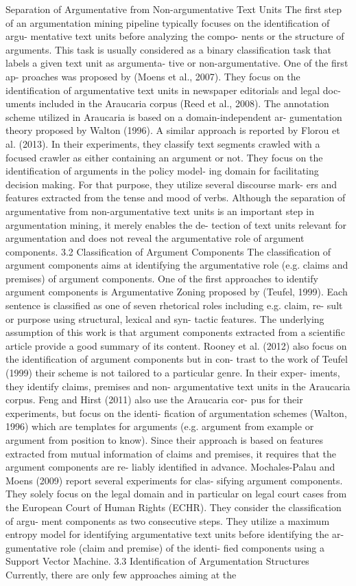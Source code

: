 Separation of Argumentative from Non-argumentative Text Units The first step of an argumentation mining pipeline typically focuses on the identification of argu- mentative text units before analyzing the compo- nents or the structure of arguments. This task is usually considered as a binary classification task that labels a given text unit as argumenta- tive or non-argumentative. One of the first ap- proaches was proposed by (Moens et al., 2007). They focus on the identification of argumentative text units in newspaper editorials and legal doc- uments included in the Araucaria corpus (Reed et al., 2008). The annotation scheme utilized in Araucaria is based on a domain-independent ar- gumentation theory proposed by Walton (1996). A similar approach is reported by Florou et al. (2013). In their experiments, they classify text segments crawled with a focused crawler as either containing an argument or not. They focus on the identification of arguments in the policy model- ing domain for facilitating decision making. For that purpose, they utilize several discourse mark- ers and features extracted from the tense and mood of verbs. Although the separation of argumentative from non-argumentative text units is an important step in argumentation mining, it merely enables the de- tection of text units relevant for argumentation and does not reveal the argumentative role of argument components. 3.2 Classification of Argument Components The classification of argument components aims at identifying the argumentative role (e.g. claims and premises) of argument components. One of the first approaches to identify argument components is Argumentative Zoning proposed by (Teufel, 1999). Each sentence is classified as one of seven rhetorical roles including e.g. claim, re- sult or purpose using structural, lexical and syn- tactic features. The underlying assumption of this work is that argument components extracted from a scientific article provide a good summary of its content. Rooney et al. (2012) also focus on the identification of argument components but in con- trast to the work of Teufel (1999) their scheme is not tailored to a particular genre. In their exper- iments, they identify claims, premises and non- argumentative text units in the Araucaria corpus. Feng and Hirst (2011) also use the Araucaria cor- pus for their experiments, but focus on the identi- fication of argumentation schemes (Walton, 1996) which are templates for arguments (e.g. argument from example or argument from position to know). Since their approach is based on features extracted from mutual information of claims and premises, it requires that the argument components are re- liably identified in advance. Mochales-Palau and Moens (2009) report several experiments for clas- sifying argument components. They solely focus on the legal domain and in particular on legal court cases from the European Court of Human Rights (ECHR). They consider the classification of argu- ment components as two consecutive steps. They utilize a maximum entropy model for identifying argumentative text units before identifying the ar- gumentative role (claim and premise) of the identi- fied components using a Support Vector Machine. 3.3 Identification of Argumentation Structures Currently, there are only few approaches aiming at the 